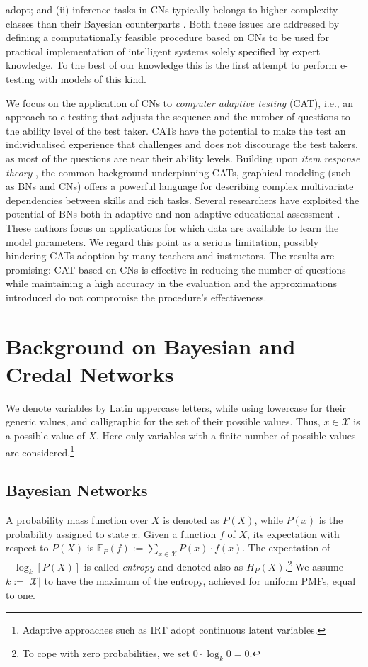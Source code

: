 \documentclass[runningheads]{llncs}
\begin{document}
adopt; and (ii) inference tasks in CNs typically belongs to higher complexity classes than their Bayesian counterparts \cite{maua14jair}. Both these issues are addressed by defining a computationally feasible procedure based on CNs to be used for practical implementation of intelligent systems solely specified by expert knowledge. To the best of our knowledge this is the first attempt to perform e-testing with models of this kind.
	
We focus on the application of CNs to \emph{computer adaptive testing} (CAT), i.e., an approach to e-testing that adjusts the sequence and the number of questions to the ability level of the test taker. CATs have the potential to make the test an individualised experience that challenges and does not discourage the test takers, as most of the questions are near their ability levels. Building upon \emph{item response theory} \cite{hambleton1985item}, the common background underpinning CATs, graphical modeling (such as BNs and CNs) offers a powerful language for describing complex multivariate dependencies between skills and rich tasks. Several researchers have exploited the potential of BNs both in adaptive and non-adaptive educational assessment \cite{vomlel2004building,plajner2015}. These authors focus on applications for which data are available to learn the model parameters. We regard this point as a serious limitation, possibly hindering CATs adoption by many teachers and instructors. The results are promising: CAT based on CNs is effective in reducing the number of questions while maintaining a high accuracy in the evaluation and the approximations introduced do not compromise the procedure's effectiveness.
	
\section{Background on Bayesian and Credal Networks}\label{sec:background}
We denote variables by Latin uppercase letters, while using lowercase for their generic values, and calligraphic for the set of their possible values. Thus, $x \in \mathcal{X}$ is a possible value of $X$. Here only variables with a finite number of possible values are considered.\footnote{Adaptive approaches such as IRT \cite{xx} adopt continuous latent variables.}


\subsection{Bayesian Networks}
A probability mass function over $X$ is denoted as $P(X)$, while $P(x)$ is the probability assigned to state $x$. Given a function $f$ of $X$, its expectation with respect to $P(X)$ is $\mathbb{E}_P(f):=\sum_{x\in\mathcal{X}} P(x) \cdot f(x)$. The expectation of $-\log_k[P(X)]$ is called \emph{entropy} and denoted also as $H_P(X)$.\footnote{To cope with zero probabilities, we set $0 \cdot \log_k 0 = 0$.} We assume $k:=|\mathcal{X}|$ to have the maximum of the entropy, achieved for uniform PMFs, equal to one.
\end{document}
